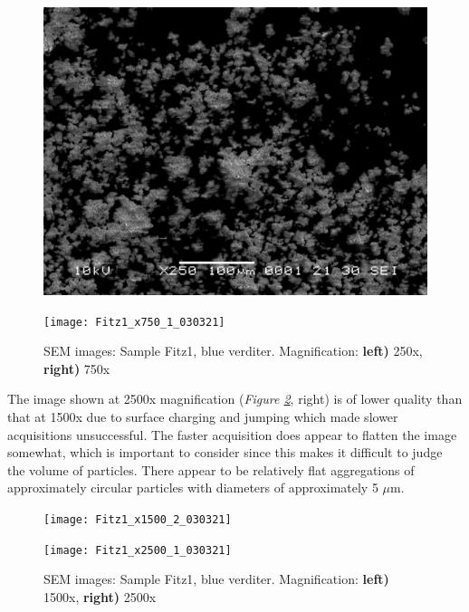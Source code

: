\begin{figure}[H]
\centering
\begin{minipage}{.45\textwidth}
  \centering
  \includegraphics[width=\linewidth]{Fitz1_x250_1_030321}
\end{minipage}
\begin{minipage}{.45\textwidth}
  \centering
  \texttt{[image: Fitz1\_x750\_1\_030321]}
\end{minipage}
\caption[SEM images: Sample Fitz1, blue verditer]{SEM images: Sample Fitz1, blue verditer. Magnification: \textbf{left)} 250x, \textbf{right)} 750x}
\label{fig:Fitz1_sem_1}
\end{figure}

The image shown at 2500x magnification (\textit{Figure \ref{fig:Fitz1_sem_2}}, right) is of lower quality than that at 1500x due to surface charging and jumping which made slower acquisitions unsuccessful. The faster acquisition does appear to flatten the image somewhat, which is important to consider since this makes it difficult to judge the volume of particles. There appear to be relatively flat aggregations of approximately circular particles with diameters of approximately 5 $\mu$m.


\begin{figure}[H]
\centering
\begin{minipage}{.45\textwidth}
  \centering
  \texttt{[image: Fitz1\_x1500\_2\_030321]}
\end{minipage}
\begin{minipage}{.45\textwidth}
  \centering
  \texttt{[image: Fitz1\_x2500\_1\_030321]}
\end{minipage}
\caption[SEM images: Sample Fitz1, blue verditer]{SEM images: Sample Fitz1, blue verditer. Magnification: \textbf{left)} 1500x, \textbf{right)} 2500x}
\label{fig:Fitz1_sem_2}
\end{figure}

